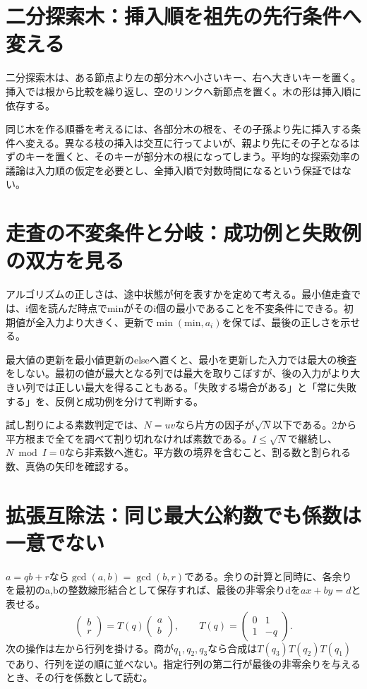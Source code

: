 \section{二分探索木：挿入順を祖先の先行条件へ変える}
\label{theory:discrete:bst}
二分探索木は、ある節点より左の部分木へ小さいキー、右へ大きいキーを置く。挿入では根から比較を繰り返し、空のリンクへ新節点を置く。木の形は挿入順に依存する\parencite{princeton_bst}。

同じ木を作る順番を考えるには、各部分木の根を、その子孫より先に挿入する条件へ変える。異なる枝の挿入は交互に行ってよいが、親より先にその子となるはずのキーを置くと、そのキーが部分木の根になってしまう。平均的な探索効率の議論は入力順の仮定を必要とし、全挿入順で対数時間になるという保証ではない。

\section{走査の不変条件と分岐：成功例と失敗例の双方を見る}
\label{theory:discrete:invariants}
アルゴリズムの正しさは、途中状態が何を表すかを定めて考える。最小値走査では、i個を読んだ時点でminがそのi個の最小であることを不変条件にできる。初期値が全入力より大きく、更新で\(\min(\mathrm{min},a_i)\)を保てば、最後の正しさを示せる。

最大値の更新を最小値更新のelseへ置くと、最小を更新した入力では最大の検査をしない。最初の値が最大となる列では最大を取りこぼすが、後の入力がより大きい列では正しい最大を得ることもある。「失敗する場合がある」と「常に失敗する」を、反例と成功例を分けて判断する。

試し割りによる素数判定では、\(N=uv\)なら片方の因子が\(\sqrt N\)以下である。2から平方根まで全てを調べて割り切れなければ素数である。\(I\le\sqrt N\)で継続し、\(N\bmod I=0\)なら非素数へ進む。平方数の境界を含むこと、割る数と割られる数、真偽の矢印を確認する。

\section{拡張互除法：同じ最大公約数でも係数は一意でない}
\label{theory:discrete:extended}
\(a=qb+r\)なら\(\gcd(a,b)=\gcd(b,r)\)である。余りの計算と同時に、各余りを最初のa,bの整数線形結合として保存すれば、最後の非零余りdを\(ax+by=d\)と表せる\parencite{mit_discrete2015}。
\[
\begin{pmatrix}b\\r\end{pmatrix}
=T(q)\begin{pmatrix}a\\b\end{pmatrix},
\qquad
T(q)=\begin{pmatrix}0&1\\1&-q\end{pmatrix}.
\]
次の操作は左から行列を掛ける。商が\(q_1,q_2,q_3\)なら合成は\(T(q_3)T(q_2)T(q_1)\)であり、行列を逆の順に並べない。指定行列の第二行が最後の非零余りを与えるとき、その行を係数として読む。

